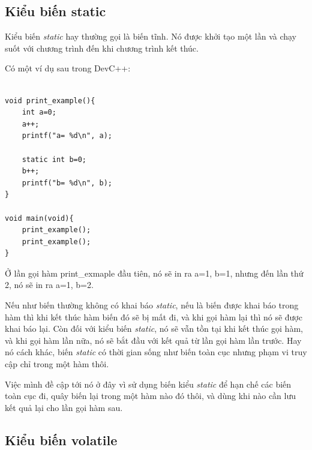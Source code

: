 \subsection{Kiểu biến static}

Kiểu biến \textit{static} hay thường gọi là biến tĩnh. Nó được khởi tạo một lần và chạy suốt với chương trình đến khi chương trình kết thúc.

Có một ví dụ sau trong DevC++:
\begin{lstlisting}

void print_example(){
	int a=0;
	a++;
	printf("a= %d\n", a);
	
	static int b=0;
	b++;
	printf("b= %d\n", b);
}

void main(void){
	print_example();
	print_example();
}

\end{lstlisting}

Ở lần gọi hàm print\_exmaple đầu tiên, nó sẽ in ra a=1, b=1, nhưng đến lần thứ 2, nó sẽ in ra a=1, b=2. 

Nếu như biến thường không có khai báo \textit{static}, nếu là biến được khai báo trong hàm thì khi kết thúc hàm biến đó sẽ bị mất đi, và khi gọi hàm lại thì nó sẽ được khai báo lại. Còn đối với kiểu biến
\textit{static}, nó sẽ vẫn tồn tại khi kết thúc gọi hàm, và khi gọi hàm lần nữa, nó sẽ bắt đầu với kết quả từ lần gọi hàm lần trước. Hay nó cách khác, biến \textit{static} có thời gian sống như biến toàn cục nhưng phạm vi truy cập chỉ trong một hàm thôi. 

Việc mình đề cập tới nó ở đây vì sử dụng biến kiểu \textit{static} để hạn chế các biến toàn cục đi, quây biến lại trong một hàm nào đó thôi, và dùng khi nào cần lưu kết quả lại cho lần gọi hàm sau.
\subsection{Kiểu biến volatile}

